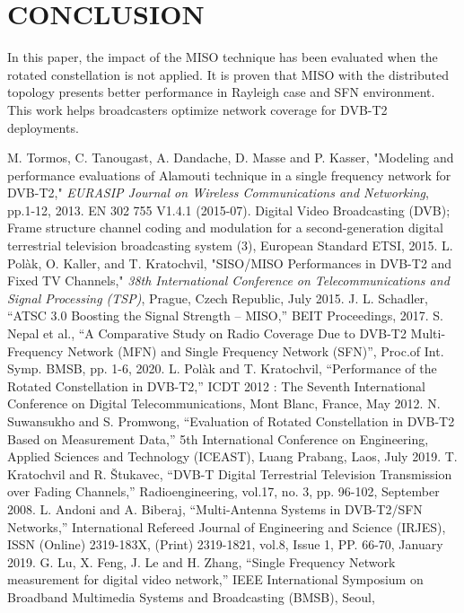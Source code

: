 \documentclass[10pt, conference]{IEEEtran}
\begin{document}
{\section{CONCLUSION}
In this paper, the impact of the MISO technique has been evaluated when the rotated constellation is not applied. It is proven that MISO with the distributed topology presents better performance in Rayleigh case and SFN environment. This work helps broadcasters optimize network coverage for DVB-T2 deployments.
}
\begin{thebibliography}{99}
 M. Tormos, C. Tanougast, A. Dandache, D. Masse and P. Kasser, "Modeling and performance evaluations of Alamouti technique in a single frequency network for DVB-T2," \emph{EURASIP Journal on Wireless Communications and Networking}, pp.1-12, 2013.
 EN 302 755 V1.4.1 (2015-07). Digital Video Broadcasting (DVB); Frame structure channel coding and modulation for a second-generation digital terrestrial television broadcasting system (3), European Standard ETSI, 2015.
 L. Polàk, O. Kaller, and T. Kratochvil, "SISO/MISO Performances in DVB-T2 and Fixed TV Channels," \emph{38th International Conference on Telecommunications and Signal Processing (TSP)}, Prague, Czech Republic, July 2015.
J. L. Schadler, “ATSC 3.0 Boosting the Signal Strength – MISO,” BEIT
Proceedings, 2017.
S. Nepal et al., “A Comparative Study on Radio Coverage Due to DVB-T2 Multi-Frequency Network (MFN) and Single Frequency Network
(SFN)”, Proc.of Int. Symp. BMSB, pp. 1-6, 2020.
L. Polàk and T. Kratochvil, “Performance of the Rotated Constellation
in DVB-T2,” ICDT 2012 : The Seventh International Conference on
Digital Telecommunications, Mont Blanc, France, May 2012.
N. Suwansukho and S. Promwong, “Evaluation of Rotated Constellation
in DVB-T2 Based on Measurement Data,” 5th International Conference
on Engineering, Applied Sciences and Technology (ICEAST), Luang
Prabang, Laos, July 2019.
T. Kratochvil and R. Štukavec, “DVB-T Digital Terrestrial Television
Transmission over Fading Channels,” Radioengineering, vol.17, no. 3,
pp. 96-102, September 2008.
 L. Andoni and A. Biberaj, “Multi-Antenna Systems in DVB-T2/SFN
Networks,” International Refereed Journal of Engineering and Science
(IRJES), ISSN (Online) 2319-183X, (Print) 2319-1821, vol.8, Issue 1,
PP. 66-70, January 2019.
G. Lu, X. Feng, J. Le and H. Zhang, “Single Frequency Network
measurement for digital video network,” IEEE International Symposium
on Broadband Multimedia Systems and Broadcasting (BMSB), Seoul,

\end{thebibliography}
\end{document}
